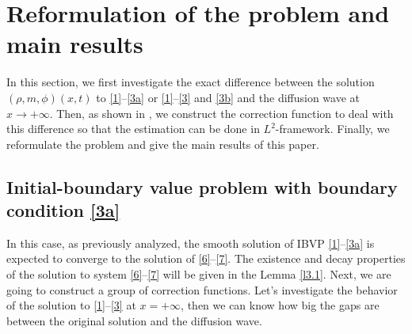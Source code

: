 \documentclass[11pt]{article}
\theoremstyle{plain}
\numberwithin{equation}{section}
\begin{document}
	\section{Reformulation of the  problem and main results}\label{sec2}

In this section, we first investigate the exact difference between the solution $\left(\rho,m,\phi\right)(x,t)$ to \eqref{1}--\eqref{3a} or \eqref{1}--\eqref{3} and \eqref{3b} and the diffusion wave at $x\to+\infty$.
Then, as shown in \cite{Hsiao-Liu1992,Nishihara-Yang1999}, we construct the correction function to deal with this difference so that the estimation can be done in $L^2$-framework. 
Finally, we reformulate the problem and give the main results of this paper.


\subsection{Initial-boundary value problem with boundary condition \eqref{3a}}



In this case, as previously analyzed, the smooth solution of IBVP \eqref{1}--\eqref{3a} is expected to converge to the solution of \eqref{6}--\eqref{7}.
The existence and decay properties of the solution to system \eqref{6}--\eqref{7} will be given in the Lemma \ref{l3.1}. 
Next, we are going to construct a group of correction functions.
Let's investigate the behavior of the solution to
	\eqref{1}--\eqref{3} at $x=+\infty$,
	then we can know how big the gaps are between the original solution and the diffusion wave.
	
\end{document}
